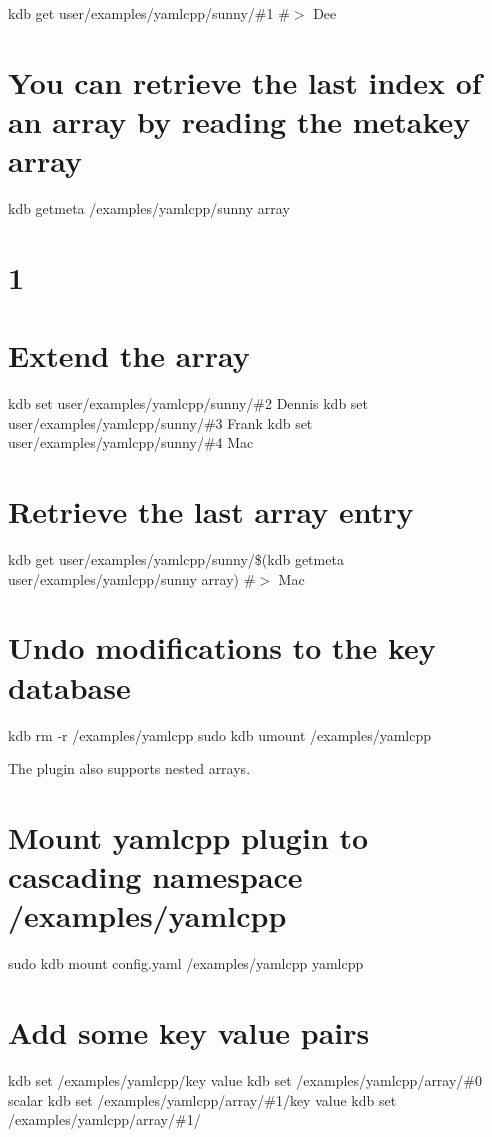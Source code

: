 kdb get user/examples/yamlcpp/sunny/\#1 \#$>$ Dee

\section*{You can retrieve the last index of an array by reading the metakey {\ttfamily array}}

kdb getmeta /examples/yamlcpp/sunny array \section*{1}

\section*{Extend the array}

kdb set user/examples/yamlcpp/sunny/\#2 Dennis kdb set user/examples/yamlcpp/sunny/\#3 Frank kdb set user/examples/yamlcpp/sunny/\#4 Mac

\section*{Retrieve the last array entry}

kdb get user/examples/yamlcpp/sunny/\$(kdb getmeta user/examples/yamlcpp/sunny array) \#$>$ Mac

\section*{Undo modifications to the key database}

kdb rm -\/r /examples/yamlcpp sudo kdb umount /examples/yamlcpp 
\begin{DoxyCode}
The plugin also supports nested arrays.
\end{DoxyCode}
 \section*{Mount yamlcpp plugin to cascading namespace {\ttfamily /examples/yamlcpp}}

sudo kdb mount config.\+yaml /examples/yamlcpp yamlcpp

\section*{Add some key value pairs}

kdb set /examples/yamlcpp/key value kdb set /examples/yamlcpp/array/\#0 scalar kdb set /examples/yamlcpp/array/\#1/key value kdb set /examples/yamlcpp/array/\#1/🔑 🙈

